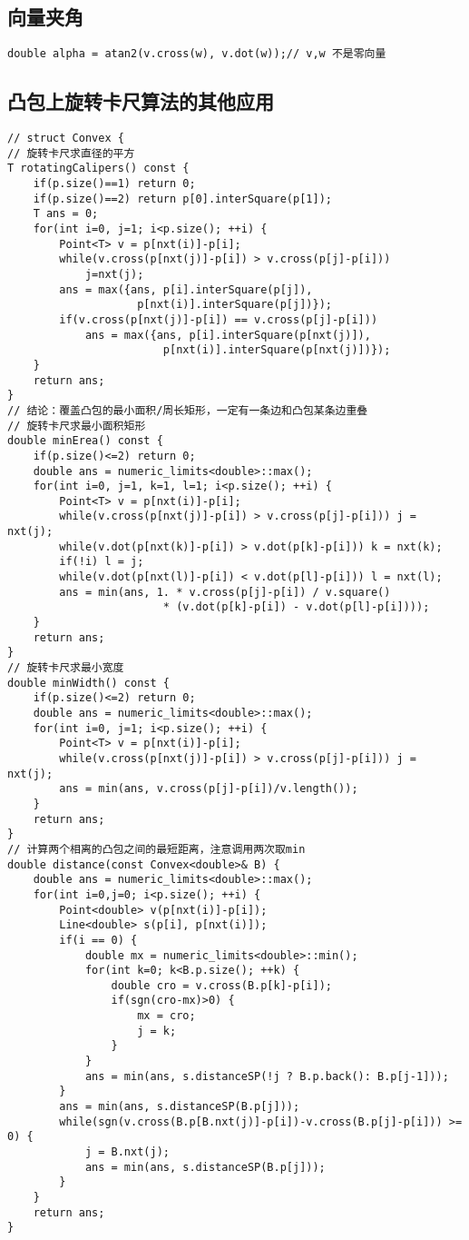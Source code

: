 \subsection{向量夹角}
\begin{lstlisting}
double alpha = atan2(v.cross(w), v.dot(w));// v,w 不是零向量
\end{lstlisting}

\subsection{凸包上旋转卡尺算法的其他应用}
\begin{lstlisting}
// struct Convex {
// 旋转卡尺求直径的平方
T rotatingCalipers() const {
    if(p.size()==1) return 0;
    if(p.size()==2) return p[0].interSquare(p[1]);
    T ans = 0;
    for(int i=0, j=1; i<p.size(); ++i) {
        Point<T> v = p[nxt(i)]-p[i];
        while(v.cross(p[nxt(j)]-p[i]) > v.cross(p[j]-p[i]))
            j=nxt(j);
        ans = max({ans, p[i].interSquare(p[j]), 
                    p[nxt(i)].interSquare(p[j])});
        if(v.cross(p[nxt(j)]-p[i]) == v.cross(p[j]-p[i]))
            ans = max({ans, p[i].interSquare(p[nxt(j)]), 
                        p[nxt(i)].interSquare(p[nxt(j)])});
    }
    return ans;
}
// 结论：覆盖凸包的最小面积/周长矩形，一定有一条边和凸包某条边重叠
// 旋转卡尺求最小面积矩形
double minErea() const {
    if(p.size()<=2) return 0;
    double ans = numeric_limits<double>::max();
    for(int i=0, j=1, k=1, l=1; i<p.size(); ++i) {
        Point<T> v = p[nxt(i)]-p[i];
        while(v.cross(p[nxt(j)]-p[i]) > v.cross(p[j]-p[i])) j = nxt(j);
        while(v.dot(p[nxt(k)]-p[i]) > v.dot(p[k]-p[i])) k = nxt(k);
        if(!i) l = j;
        while(v.dot(p[nxt(l)]-p[i]) < v.dot(p[l]-p[i])) l = nxt(l);
        ans = min(ans, 1. * v.cross(p[j]-p[i]) / v.square()
                        * (v.dot(p[k]-p[i]) - v.dot(p[l]-p[i])));
    }
    return ans;
}
// 旋转卡尺求最小宽度
double minWidth() const {
    if(p.size()<=2) return 0;
    double ans = numeric_limits<double>::max();
    for(int i=0, j=1; i<p.size(); ++i) {
        Point<T> v = p[nxt(i)]-p[i];
        while(v.cross(p[nxt(j)]-p[i]) > v.cross(p[j]-p[i])) j = nxt(j);
        ans = min(ans, v.cross(p[j]-p[i])/v.length());
    }
    return ans;
}
// 计算两个相离的凸包之间的最短距离，注意调用两次取min
double distance(const Convex<double>& B) {
    double ans = numeric_limits<double>::max();
    for(int i=0,j=0; i<p.size(); ++i) {
        Point<double> v(p[nxt(i)]-p[i]);
        Line<double> s(p[i], p[nxt(i)]);
        if(i == 0) {
            double mx = numeric_limits<double>::min();
            for(int k=0; k<B.p.size(); ++k) {
                double cro = v.cross(B.p[k]-p[i]);
                if(sgn(cro-mx)>0) {
                    mx = cro;
                    j = k;
                }
            }
            ans = min(ans, s.distanceSP(!j ? B.p.back(): B.p[j-1]));
        }
        ans = min(ans, s.distanceSP(B.p[j]));
        while(sgn(v.cross(B.p[B.nxt(j)]-p[i])-v.cross(B.p[j]-p[i])) >= 0) {
            j = B.nxt(j);
            ans = min(ans, s.distanceSP(B.p[j]));
        }
    }
    return ans;
}
\end{lstlisting}

